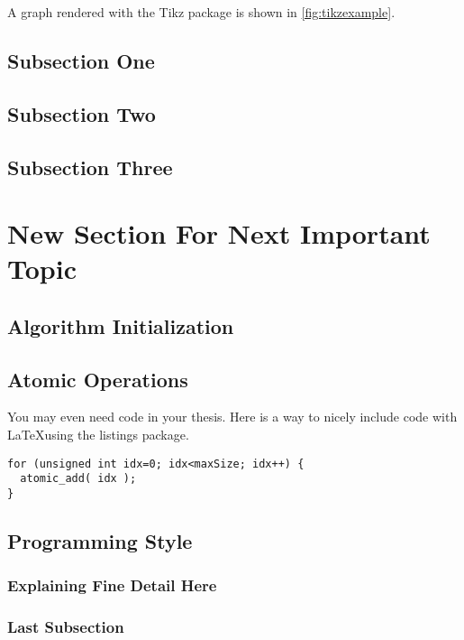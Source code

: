 A graph rendered with the Tikz package is shown in \autoref{fig:tikzexample}.

\subsection{Subsection One}
\subsection{Subsection Two}
\subsection{Subsection Three}

\section{New Section For Next Important Topic}

\subsection{Algorithm Initialization}
\subsection{Atomic Operations}

You may even need code in your thesis. Here is a way to nicely include code with \LaTeX using the listings package.
{\singlespace
\begin{lstlisting}
for (unsigned int idx=0; idx<maxSize; idx++) {
  atomic_add( idx );
}
\end{lstlisting}
}

\subsection{Programming Style}
\subsubsection{Explaining Fine Detail Here}

\subsubsection{Last Subsection}
